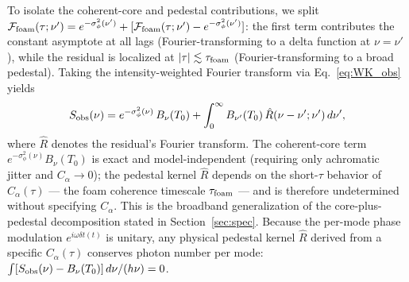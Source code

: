 \documentclass[aps,prd,onecolumn,amsmath,amssymb]{revtex4-2}
\begin{document}
To isolate the coherent-core
and pedestal contributions, we split
$\mathcal{F}_{\rm foam}(\tau;\nu')=e^{-\sigma_\phi^2(\nu')}+
[\mathcal{F}_{\rm foam}(\tau;\nu')-e^{-\sigma_\phi^2(\nu')}]$: the
first term contributes the constant asymptote at all lags
(Fourier-transforming to a delta function at $\nu=\nu'$), while the
residual is localized at $|\tau|\lesssim\tau_{\rm foam}$
(Fourier-transforming to a broad pedestal).  Taking the
intensity-weighted Fourier transform via Eq.~\eqref{eq:WK_obs} yields
\begin{equation}
  S_{\rm obs}(\nu)
    = e^{-\sigma_\phi^2(\nu)}\,B_\nu(T_0)
    + \int_0^\infty B_{\nu'}(T_0)\,\hat{R}(\nu-\nu';\nu')\,d\nu',
  \label{eq:CMB_spectrum}
\end{equation}
where $\hat{R}$ denotes the residual's Fourier transform.  The
coherent-core term $e^{-\sigma_\phi^2(\nu)}B_\nu(T_0)$ is exact and
model-independent (requiring only achromatic jitter and
$C_\alpha\to 0$); the pedestal kernel $\hat{R}$ depends on the
short-$\tau$ behavior of $C_\alpha(\tau)$ --- the foam coherence
timescale $\tau_{\rm foam}$ --- and is therefore undetermined without
specifying $C_\alpha$.  This is the broadband generalization of the
core-plus-pedestal decomposition stated in Section~\ref{sec:spec}.
Because the per-mode phase modulation $e^{i\omega\delta t(t)}$ is
unitary, any physical pedestal kernel $\hat{R}$ derived from a
specific $C_\alpha(\tau)$ conserves photon number per mode:
$\int [S_{\rm obs}(\nu)-B_\nu(T_0)]\,d\nu/(h\nu)=0$.
\end{document}
